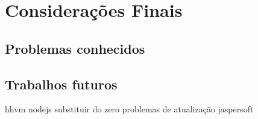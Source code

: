 \chapter{Considerações Finais}\label{cap:consideracoes-finais}

\section{Problemas conhecidos}

\section{Trabalhos futuros}
hhvm
nodejs
substituir do zero
problemas de atualização
jaspersoft
